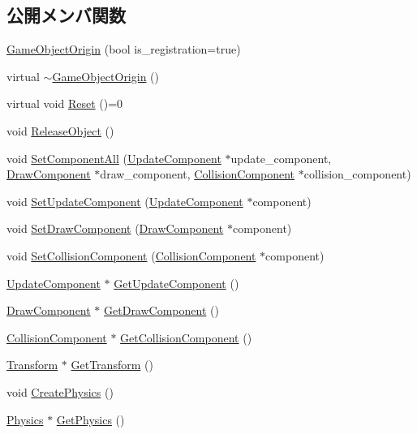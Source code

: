 \subsection*{公開メンバ関数}
\begin{DoxyCompactItemize}
\item 
\mbox{\hyperlink{class_game_object_origin_a0f262057d72762d4744b7c7306ba5f8e}{Game\+Object\+Origin}} (bool is\+\_\+registration=true)
\item 
virtual \mbox{\hyperlink{class_game_object_origin_a11fd9b09ec834a887253f82d83191bff}{$\sim$\+Game\+Object\+Origin}} ()
\item 
virtual void \mbox{\hyperlink{class_game_object_origin_af9af378a4fd9028316a6fdb461ed6a10}{Reset}} ()=0
\item 
void \mbox{\hyperlink{class_game_object_origin_a8fcc96e945f103f2f7daf009ee2b83dc}{Release\+Object}} ()
\item 
void \mbox{\hyperlink{class_game_object_origin_a6dc8d3becc806dd6cf89663af981127e}{Set\+Component\+All}} (\mbox{\hyperlink{class_update_component}{Update\+Component}} $\ast$update\+\_\+component, \mbox{\hyperlink{class_draw_component}{Draw\+Component}} $\ast$draw\+\_\+component, \mbox{\hyperlink{class_collision_component}{Collision\+Component}} $\ast$collision\+\_\+component)
\item 
void \mbox{\hyperlink{class_game_object_origin_af6d261955caa797840b7af719a17b735}{Set\+Update\+Component}} (\mbox{\hyperlink{class_update_component}{Update\+Component}} $\ast$component)
\item 
void \mbox{\hyperlink{class_game_object_origin_a525d9ecb39e10295bda324afbefbcc74}{Set\+Draw\+Component}} (\mbox{\hyperlink{class_draw_component}{Draw\+Component}} $\ast$component)
\item 
void \mbox{\hyperlink{class_game_object_origin_acdf9e2140b71df0309d28b4dd90476d7}{Set\+Collision\+Component}} (\mbox{\hyperlink{class_collision_component}{Collision\+Component}} $\ast$component)
\item 
\mbox{\hyperlink{class_update_component}{Update\+Component}} $\ast$ \mbox{\hyperlink{class_game_object_origin_ae78266b6003847e18b9a902a6585a613}{Get\+Update\+Component}} ()
\item 
\mbox{\hyperlink{class_draw_component}{Draw\+Component}} $\ast$ \mbox{\hyperlink{class_game_object_origin_a768ddc2525b6fd51b6d23e8f2b7ad744}{Get\+Draw\+Component}} ()
\item 
\mbox{\hyperlink{class_collision_component}{Collision\+Component}} $\ast$ \mbox{\hyperlink{class_game_object_origin_af2cfb6cd75e995b7791385fcc1f6f859}{Get\+Collision\+Component}} ()
\item 
\mbox{\hyperlink{class_transform}{Transform}} $\ast$ \mbox{\hyperlink{class_game_object_origin_aaef5e72f8ad3eff98522528c1cf6bbc2}{Get\+Transform}} ()
\item 
void \mbox{\hyperlink{class_game_object_origin_ad0b1dff8bffb44125214d60201572041}{Create\+Physics}} ()
\item 
\mbox{\hyperlink{class_physics}{Physics}} $\ast$ \mbox{\hyperlink{class_game_object_origin_a878b71d82a2f2011d2e2a2e9b9e497af}{Get\+Physics}} ()
\end{DoxyCompactItemize}
